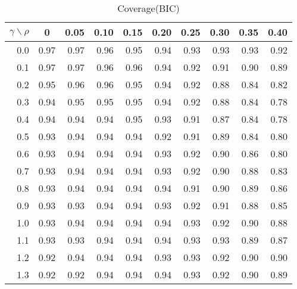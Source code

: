 \documentclass[12pt]{article}
\begin{document}
%
\begin{table}[!tbp]
\caption{Coverage(BIC)}
 \begin{center}
 \begin{tabular}{r|rrrrrrrrr}\hline\hline
\multicolumn{1}{c|}{$\gamma\backslash\rho$}&\multicolumn{1}{c}{0}&\multicolumn{1}{c}{0.05}&\multicolumn{1}{c}{0.10}&\multicolumn{1}{c}{0.15}&\multicolumn{1}{c}{0.20}&\multicolumn{1}{c}{0.25}&\multicolumn{1}{c}{0.30}&\multicolumn{1}{c}{0.35}&\multicolumn{1}{c}{0.40}\tabularnewline
\hline

0.0&0.97&0.97&0.96&0.95&0.94&0.93&0.93&0.93&0.92\tabularnewline
0.1&0.97&0.97&0.96&0.96&0.94&0.92&0.91&0.90&0.89\tabularnewline
0.2&0.95&0.96&0.96&0.95&0.94&0.92&0.88&0.84&0.82\tabularnewline
0.3&0.94&0.95&0.95&0.95&0.94&0.92&0.88&0.84&0.78\tabularnewline
0.4&0.94&0.94&0.94&0.95&0.93&0.91&0.87&0.84&0.78\tabularnewline
0.5&0.93&0.94&0.94&0.94&0.92&0.91&0.89&0.84&0.80\tabularnewline
0.6&0.93&0.94&0.94&0.94&0.93&0.92&0.90&0.86&0.80\tabularnewline
0.7&0.93&0.94&0.94&0.94&0.93&0.92&0.90&0.88&0.83\tabularnewline
0.8&0.93&0.94&0.94&0.94&0.94&0.91&0.90&0.89&0.86\tabularnewline
0.9&0.93&0.93&0.94&0.94&0.93&0.92&0.91&0.88&0.85\tabularnewline
1.0&0.93&0.94&0.94&0.94&0.94&0.93&0.92&0.90&0.88\tabularnewline
1.1&0.93&0.93&0.94&0.94&0.94&0.93&0.93&0.89&0.87\tabularnewline
1.2&0.92&0.94&0.94&0.94&0.93&0.93&0.92&0.90&0.90\tabularnewline
1.3&0.92&0.92&0.94&0.94&0.94&0.93&0.92&0.90&0.89\tabularnewline
\hline
\end{tabular}

\end{center}

\end{table}
\end{document}
